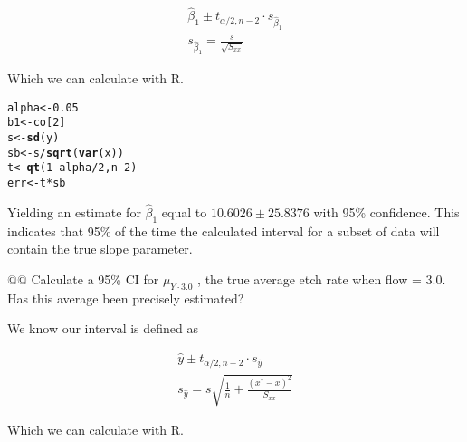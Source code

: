 \documentclass[10pt]{article}\usepackage[]{graphicx}\usepackage[]{xcolor}
\makeatletter
\newcommand{\hlnum}[1]{\textcolor[rgb]{0.686,0.059,0.569}{#1} }%
\newcommand{\hlopt}[1]{\textcolor[rgb]{0,0,0}{#1} }%
\newcommand{\hlstd}[1]{\textcolor[rgb]{0.345,0.345,0.345}{#1} }%
\newcommand{\hlkwb}[1]{\textcolor[rgb]{0.69,0.353,0.396}{#1} }%
\newcommand{\hlkwd}[1]{\textcolor[rgb]{0.737,0.353,0.396}{\textbf{#1} } }%
\newenvironment{kframe}{%
 \def\at@end@of@kframe{}%
 \ifinner\ifhmode%
  \def\at@end@of@kframe{\end{minipage} }%
  \begin{minipage}{\columnwidth}%
 \fi\fi%
 \def\FrameCommand##1{\hskip\@totalleftmargin \hskip-\fboxsep
 \colorbox{shadecolor}{##1}\hskip-\fboxsep
     \hskip-\linewidth \hskip-\@totalleftmargin \hskip\columnwidth}%
 \MakeFramed {\advance\hsize-\width
   \@totalleftmargin\z@ \linewidth\hsize
   \@setminipage} }%
 {\par\unskip\endMakeFramed%
 \at@end@of@kframe}
\newenvironment{knitrout}{}{} %
\makeatother
\begin{document}
\begin{easylist}[enumerate]
    \begin{equation}
        \begin{aligned}
            \hat{\beta}_1 \pm t_{\alpha / 2, n - 2} \cdot s_{\hat{\beta}_1}\\
            s_{\hat{\beta}_1} = \frac{s}{\sqrt{S_{xx} } }
        \end{aligned}
    \end{equation}

    Which we can calculate with R.

\begin{knitrout}
\color{fgcolor}\begin{kframe}
\begin{alltt}
         \hlstd{alpha} \hlkwb{<-} \hlnum{0.05}
         \hlstd{b1} \hlkwb{<-} \hlstd{co[}\hlnum{2}\hlstd{]}
         \hlstd{s} \hlkwb{<-} \hlkwd{sd}\hlstd{(y)}
         \hlstd{sb} \hlkwb{<-} \hlstd{s} \hlopt{/} \hlkwd{sqrt}\hlstd{(}\hlkwd{var}\hlstd{(x))}
         \hlstd{t} \hlkwb{<-} \hlkwd{qt}\hlstd{(}\hlnum{1} \hlopt{-} \hlstd{alpha} \hlopt{/} \hlnum{2}\hlstd{, n} \hlopt{-} \hlnum{2}\hlstd{)}
         \hlstd{err} \hlkwb{<-} \hlstd{t} \hlopt{*} \hlstd{sb}
\end{alltt}
\end{kframe}
\end{knitrout}


    Yielding an estimate for $\hat{\beta}_1$ equal to $10.6026 \pm 25.8376$ with 95\% confidence. This indicates
    that 95\% of the time the calculated interval for a subset of data will contain the true slope parameter.

    @@ Calculate a 95\% CI for $\mu_{Y \cdot 3.0}$ , the true average etch rate when flow = 3.0. Has this average been
    precisely estimated?\newline

    We know our interval is defined as

    \begin{equation}
        \begin{aligned}
            \hat{y} \pm t_{\alpha / 2, n - 2} \cdot s_{\hat{y} }\\
            s_{\hat{y} } = s \sqrt{\frac{1}{n} + \frac{ {\left( x^* - \overline{x} \right)}^2}{S_{xx} } }
        \end{aligned}
    \end{equation}

    Which we can calculate with R.


\end{easylist}
\end{document}

